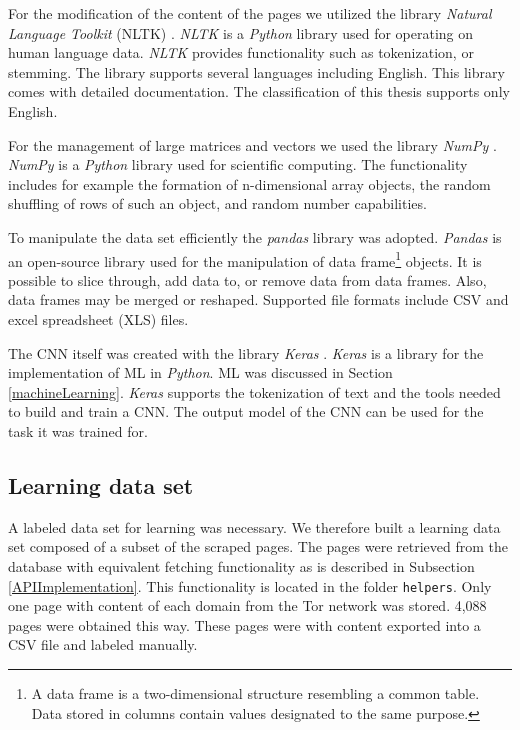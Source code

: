 For the modification of the content of the pages we utilized the library \textit{Natural Language Toolkit} (NLTK) \cite{nltk}. \textit{NLTK} is a \textit{Python} library used for operating on human language data. \textit{NLTK} provides functionality such as tokenization, or stemming. The library supports several languages including English. This library comes with detailed documentation. The classification of this thesis supports only English.

For the management of large matrices and vectors we used the library \textit{NumPy} \cite{numpy}. \textit{NumPy} is a \textit{Python} library used for scientific computing. The functionality includes for example the formation of n-dimensional array objects, the random shuffling of rows of such an object, and random number capabilities. 

To manipulate the data set efficiently the \textit{pandas} library \cite{pandas} was adopted. \textit{Pandas} is an open-source library used for the manipulation of data frame\footnote{A data frame is a two-dimensional structure resembling a common table. Data stored in columns contain values designated to the same purpose. } objects. It is possible to slice through, add data to, or remove data from data frames. Also, data frames may be merged or reshaped. Supported file formats include CSV and excel spreadsheet (XLS) files.

The CNN itself was created with the library \textit{Keras} \cite{keras}. \textit{Keras} is a library for the implementation of ML in \textit{Python}. ML was discussed in Section \ref{machineLearning}. \textit{Keras} supports the tokenization of text and the tools needed to build and train a CNN. The output model of the CNN can be used for the task it was trained for.

\subsection{Learning data set} \label{LearningDatasetImplementation}
A labeled data set for learning was necessary. We therefore built a learning data set composed of a subset of the scraped pages. The pages were retrieved from the database with equivalent fetching functionality as is described in Subsection \ref{APIImplementation}. This functionality is located in the folder \texttt{helpers}. Only one page with content of each domain from the Tor network was stored. 4,088 pages were obtained this way. These pages were with content exported into a CSV file and labeled manually. 

